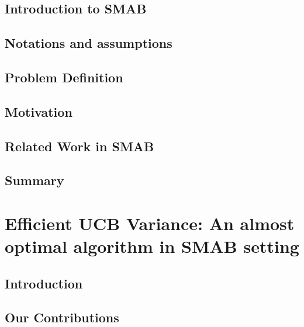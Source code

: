 \documentclass[MS]{iitmdiss}
\begin{document}
\section{Introduction to SMAB}
\label{sec:intro}


\section{Notations and assumptions}
\label{sec:notations}


\section{Problem Definition}
\label{sec:probDef}


\section{Motivation}
\label{sec:motivation}


\section{Related Work in SMAB}
\label{sec:related}


\section{Summary}
\label{chap2:conc}






\chapter{Efficient UCB Variance: An almost optimal algorithm in SMAB setting}
\label{chap:EUCBV}

\section{Introduction}
\label{Chapter3:intro}



\section{Our Contributions}
\label{sec:contri}

\end{document}
